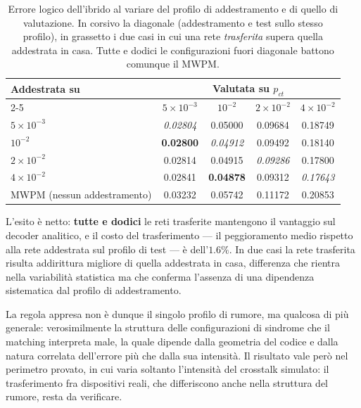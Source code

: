 \begin{table}[H]

\centering
\small
\begin{tabular}{lcccc}
\toprule
\textbf{Addestrata su} & \multicolumn{4}{c}{\textbf{Valutata su} $p_{ct}$} \\
\cmidrule(lr){2-5}
 & $5\times10^{-3}$ & $10^{-2}$ & $2\times10^{-2}$ & $4\times10^{-2}$ \\
\midrule
$5\times10^{-3}$ & \textit{0.02804} & 0.05000 & 0.09684 & 0.18749 \\
\addlinespace[0.3em]
$10^{-2}$        & \textbf{0.02800} & \textit{0.04912} & 0.09492 & 0.18140 \\
\addlinespace[0.3em]
$2\times10^{-2}$ & 0.02814 & 0.04915 & \textit{0.09286} & 0.17800 \\
\addlinespace[0.3em]
$4\times10^{-2}$ & 0.02841 & \textbf{0.04878} & 0.09312 & \textit{0.17643} \\
\midrule
\ac{MWPM} (nessun addestramento) & 0.03232 & 0.05742 & 0.11172 & 0.20853 \\
\bottomrule
\end{tabular}
\caption[Trasferibilità del decoder appreso fra profili di rumore]{Errore logico dell'ibrido al variare del profilo di addestramento e di quello di valutazione. In corsivo la diagonale (addestramento e test sullo stesso profilo), in grassetto i due casi in cui una rete \emph{trasferita} supera quella addestrata in casa. Tutte e dodici le configurazioni fuori diagonale battono comunque il \ac{MWPM}.}\label{tab:neural_trasferimento}

\end{table}

L'esito è netto: \textbf{tutte e dodici} le reti trasferite mantengono il vantaggio sul decoder analitico, e il costo del trasferimento --- il peggioramento medio rispetto alla rete addestrata sul profilo di test --- è dell'$1.6\%$. In due casi la rete trasferita risulta addirittura migliore di quella addestrata in casa, differenza che rientra nella variabilità statistica ma che conferma l'assenza di una dipendenza sistematica dal profilo di addestramento.

La regola appresa non è dunque il singolo profilo di rumore, ma qualcosa di più generale: verosimilmente la struttura delle configurazioni di sindrome che il matching interpreta male, la quale dipende dalla geometria del codice e dalla natura correlata dell'errore più che dalla sua intensità. Il risultato vale però nel perimetro provato, in cui varia soltanto l'intensità del crosstalk simulato: il trasferimento fra dispositivi reali, che differiscono anche nella struttura del rumore, resta da verificare.



